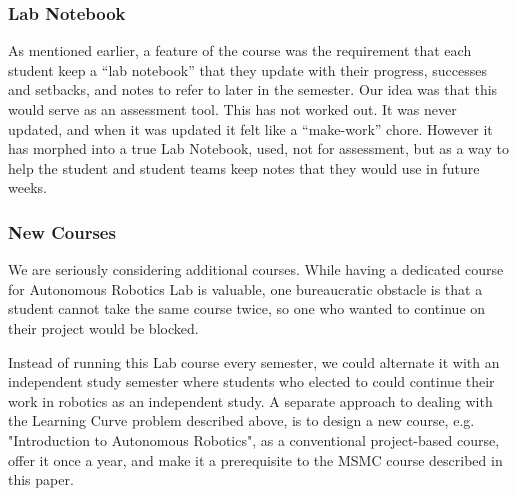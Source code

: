\subsubsection{Lab Notebook}As mentioned earlier, a feature of the course was the requirement that each student keep a ``lab notebook'' that they update with their progress, successes and setbacks, and notes to refer to later in the semester. Our idea was that this would serve as an assessment tool. This has not worked out. It was never updated, and when it was updated it felt like a ``make-work'' chore. However it has morphed into a true Lab Notebook, used, not for assessment, but as a way to help the student and student teams keep notes that they would use in future weeks.
\subsubsection{New Courses}We are seriously considering additional courses. While having a dedicated course for Autonomous Robotics Lab is valuable, one bureaucratic obstacle is that a student cannot take the same course twice, so one who wanted to continue on their project would be blocked. 

Instead of running this Lab course every semester, we could alternate it with an independent study semester where students who elected to could continue their work in robotics as an independent study. A separate approach to dealing with the Learning Curve problem described above, is to design a new course, e.g. "Introduction to Autonomous Robotics", as a conventional project-based course, offer it once a year, and make it a prerequisite to the MSMC course described in this paper.


